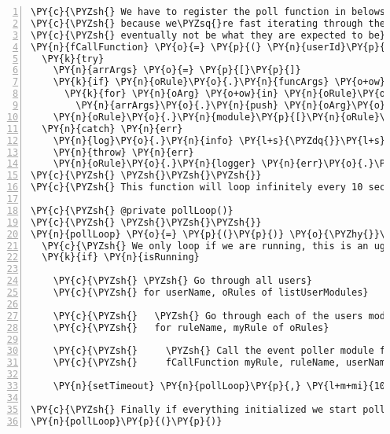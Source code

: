 \begin{Verbatim}[fontsize=\scriptsize,commandchars=\\\{\},numbers=left,firstnumber=1,stepnumber=1]
\PY{c}{\PYZsh{} We have to register the poll function in belows anonymous function}
\PY{c}{\PYZsh{} because we\PYZsq{}re fast iterating through the listUserModules and references will}
\PY{c}{\PYZsh{} eventually not be what they are expected to be}
\PY{n}{fCallFunction} \PY{o}{=} \PY{p}{(} \PY{n}{userId}\PY{p}{,} \PY{n}{ruleId}\PY{p}{,} \PY{n}{oRule} \PY{p}{)} \PY{o}{\PYZhy{}}\PY{o}{\PYZgt{}}
  \PY{k}{try}
    \PY{n}{arrArgs} \PY{o}{=} \PY{p}{[}\PY{p}{]}
    \PY{k}{if} \PY{n}{oRule}\PY{o}{.}\PY{n}{funcArgs} \PY{o+ow}{and} \PY{n}{oRule}\PY{o}{.}\PY{n}{funcArgs}\PY{p}{[}\PY{n}{oRule}\PY{o}{.}\PY{n}{pollfunc}\PY{p}{]}
      \PY{k}{for} \PY{n}{oArg} \PY{o+ow}{in} \PY{n}{oRule}\PY{o}{.}\PY{n}{funcArgs}\PY{p}{[}\PY{n}{oRule}\PY{o}{.}\PY{n}{pollfunc}\PY{p}{]}
        \PY{n}{arrArgs}\PY{o}{.}\PY{n}{push} \PY{n}{oArg}\PY{o}{.}\PY{n}{value}
    \PY{n}{oRule}\PY{o}{.}\PY{n}{module}\PY{p}{[}\PY{n}{oRule}\PY{o}{.}\PY{n}{pollfunc}\PY{p}{]}\PY{o}{.}\PY{n}{apply} \PY{n}{this}\PY{p}{,} \PY{n}{arrArgs}
  \PY{n}{catch} \PY{n}{err}
    \PY{n}{log}\PY{o}{.}\PY{n}{info} \PY{l+s}{\PYZdq{}}\PY{l+s}{EP | ERROR in module when polled: \PYZsh{}\PYZob{} oRule.id \PYZcb{} \PYZsh{}\PYZob{} userId \PYZcb{}: \PYZsh{}\PYZob{}err.message\PYZcb{}}\PY{l+s}{\PYZdq{}}
    \PY{n}{throw} \PY{n}{err}
    \PY{n}{oRule}\PY{o}{.}\PY{n}{logger} \PY{n}{err}\PY{o}{.}\PY{n}{message}
\PY{c}{\PYZsh{} \PYZsh{}\PYZsh{}\PYZsh{}}
\PY{c}{\PYZsh{} This function will loop infinitely every 10 seconds until isRunning is set to false}

\PY{c}{\PYZsh{} @private pollLoop()}
\PY{c}{\PYZsh{} \PYZsh{}\PYZsh{}\PYZsh{}}
\PY{n}{pollLoop} \PY{o}{=} \PY{p}{(}\PY{p}{)} \PY{o}{\PYZhy{}}\PY{o}{\PYZgt{}}
  \PY{c}{\PYZsh{} We only loop if we are running, this is an ugly keep\PYZhy{}alive for legacy reasons...}
  \PY{k}{if} \PY{n}{isRunning}

    \PY{c}{\PYZsh{} \PYZsh{} Go through all users}
    \PY{c}{\PYZsh{} for userName, oRules of listUserModules}

    \PY{c}{\PYZsh{}   \PYZsh{} Go through each of the users modules}
    \PY{c}{\PYZsh{}   for ruleName, myRule of oRules}

    \PY{c}{\PYZsh{}     \PYZsh{} Call the event poller module function}
    \PY{c}{\PYZsh{}     fCallFunction myRule, ruleName, userName}

    \PY{n}{setTimeout} \PY{n}{pollLoop}\PY{p}{,} \PY{l+m+mi}{10000}

\PY{c}{\PYZsh{} Finally if everything initialized we start polling for new events}
\PY{n}{pollLoop}\PY{p}{(}\PY{p}{)}
\end{Verbatim}

